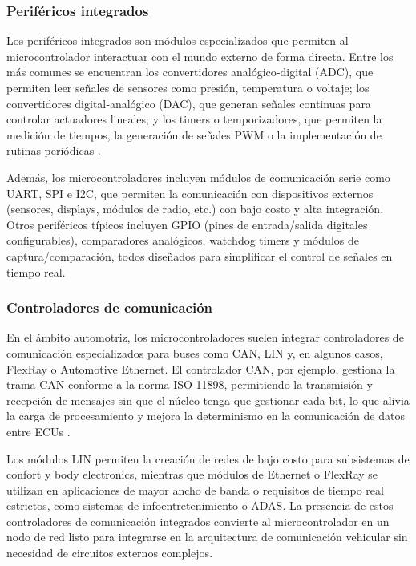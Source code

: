 \subsubsection{Periféricos integrados}
Los periféricos integrados son módulos especializados que permiten al microcontrolador interactuar con el mundo externo de forma directa. Entre los más comunes se encuentran los convertidores analógico‑digital (ADC), que permiten leer señales de sensores como presión, temperatura o voltaje; los convertidores digital‑analógico (DAC), que generan señales continuas para controlar actuadores lineales; y los timers o temporizadores, que permiten la medición de tiempos, la generación de señales PWM o la implementación de rutinas periódicas \citep{EmbebidosUruguay, AutomotiveEmbeddedHandbook}.

Además, los microcontroladores incluyen módulos de comunicación serie como UART, SPI e I2C, que permiten la comunicación con dispositivos externos (sensores, displays, módulos de radio, etc.) con bajo costo y alta integración. Otros periféricos típicos incluyen GPIO (pines de entrada/salida digitales configurables), comparadores analógicos, watchdog timers y módulos de captura/comparación, todos diseñados para simplificar el control de señales en tiempo real.

\subsubsection{Controladores de comunicación}
En el ámbito automotriz, los microcontroladores suelen integrar controladores de comunicación especializados para buses como CAN, LIN y, en algunos casos, FlexRay o Automotive Ethernet. El controlador CAN, por ejemplo, gestiona la trama CAN conforme a la norma ISO 11898, permitiendo la transmisión y recepción de mensajes sin que el núcleo tenga que gestionar cada bit, lo que alivia la carga de procesamiento y mejora la determinismo en la comunicación de datos entre ECUs \citep{ISO11898, AutomotiveEmbeddedHandbook}.

Los módulos LIN permiten la creación de redes de bajo costo para subsistemas de confort y body electronics, mientras que módulos de Ethernet o FlexRay se utilizan en aplicaciones de mayor ancho de banda o requisitos de tiempo real estrictos, como sistemas de infoentretenimiento o ADAS. La presencia de estos controladores de comunicación integrados convierte al microcontrolador en un nodo de red listo para integrarse en la arquitectura de comunicación vehicular sin necesidad de circuitos externos complejos.

